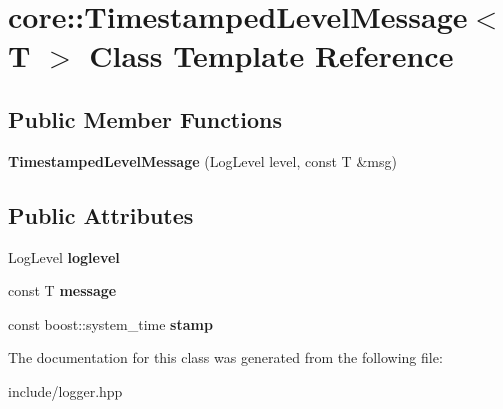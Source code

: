 \hypertarget{classcore_1_1_timestamped_level_message}{\section{core\-:\-:Timestamped\-Level\-Message$<$ T $>$ Class Template Reference}
\label{classcore_1_1_timestamped_level_message}
}
\subsection*{Public Member Functions}
\begin{DoxyCompactItemize}
\item 
\hypertarget{classcore_1_1_timestamped_level_message_aeca473c85ba3d4f7cab1407e4f0cc73c}{{\bfseries Timestamped\-Level\-Message} (Log\-Level level, const T \&msg)}\label{classcore_1_1_timestamped_level_message_aeca473c85ba3d4f7cab1407e4f0cc73c}

\end{DoxyCompactItemize}
\subsection*{Public Attributes}
\begin{DoxyCompactItemize}
\item 
\hypertarget{classcore_1_1_timestamped_level_message_af1f33107f897ca781d1d42973230f1b1}{Log\-Level {\bfseries loglevel}}\label{classcore_1_1_timestamped_level_message_af1f33107f897ca781d1d42973230f1b1}

\item 
\hypertarget{classcore_1_1_timestamped_level_message_a420ed49ddeb75e0860a1697d85d98599}{const T {\bfseries message}}\label{classcore_1_1_timestamped_level_message_a420ed49ddeb75e0860a1697d85d98599}

\item 
\hypertarget{classcore_1_1_timestamped_level_message_a9bda7bc4137c37a889b049f9f2d6272f}{const boost\-::system\-\_\-time {\bfseries stamp}}\label{classcore_1_1_timestamped_level_message_a9bda7bc4137c37a889b049f9f2d6272f}

\end{DoxyCompactItemize}


The documentation for this class was generated from the following file\-:\begin{DoxyCompactItemize}
\item 
include/logger.\-hpp\end{DoxyCompactItemize}
